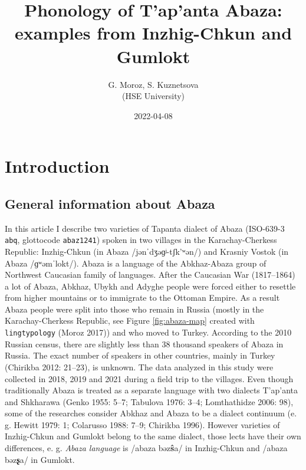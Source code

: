 \documentclass[
]{article}
\title{Phonology of T'ap'anta Abaza: examples from Inzhig-Chkun and
Gumlokt}
\author{G. Moroz, S. Kuznetsova\\
(HSE University)}
\date{2022-04-08}
\begin{document}
\maketitle

{
\setcounter{tocdepth}{2}
\tableofcontents
}
\pagebreak

\hypertarget{introduction}{%
\section{Introduction}\label{introduction}}

\hypertarget{general-information-about-abaza}{%
\subsection{General information about
Abaza}\label{general-information-about-abaza}}

In this article I describe two varieties of Tapanta dialect of Abaza
(ISO-639-3 \texttt{abq}, glottocode \texttt{abaz1241}) spoken in two
villages in the Karachay-Cherkess Republic: Inzhig-Chkun (in Abaza
/jənˈdʒəɡʲ-tʃk'ʷən/) and Krasniy Vostok (in Abaza /ɡʷəmˈlokt/). Abaza is
a language of the Abkhaz-Abaza group of Northwest Caucasian family of
languages. After the Caucasian War (1817--1864) a lot of Abaza, Abkhaz,
Ubykh and Adyghe people were forced either to resettle from higher
mountains or to immigrate to the Ottoman Empire. As a result Abaza
people were split into those who remain in Russia (mostly in the
Karachay-Cherkess Republic, see Figure \ref{fig:abaza-map} created with
\texttt{lingtypology} (Moroz 2017)) and who moved to Turkey. According
to the 2010 Russian census, there are slightly less than 38 thousand
speakers of Abaza in Russia. The exact number of speakers in other
countries, mainly in Turkey (Chirikba 2012: 21--23), is unknown. The
data analyzed in this study were collected in 2018, 2019 and 2021 during
a field trip to the villages. Even though traditionally Abaza is treated
as a separate language with two dialects T'ap'anta and Shkharawa (Genko
1955: 5--7; Tabulova 1976: 3--4; Lomthathidze 2006: 98), some of the
researches consider Abkhaz and Abaza to be a dialect continuum (e. g.
Hewitt 1979: 1; Colarusso 1988: 7--9; Chirikba 1996). However varieties
of Inzhig-Chkun and Gumlokt belong to the same dialect, those lects have
their own differences, e. g. \emph{Abaza language} is /abaza
bəz\textbf{ŝ}a/ in Inzhig-Chkun and /abaza bəz\textbf{ʂ}a/ in Gumlokt.
\end{document}
